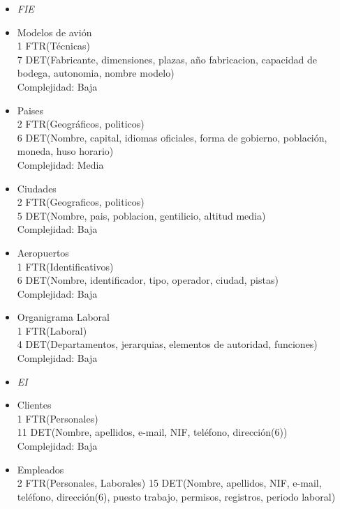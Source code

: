 \begin{enumerate}
	\begin{itemize}
	\item\textit{FIE}
		\item Modelos de avión \\
			1 FTR(Técnicas) \\
			7 DET(Fabricante, dimensiones, plazas, año fabricacion, capacidad de bodega, autonomia, nombre modelo) \\
			Complejidad: Baja\\
		\item Paises \\
			2 FTR(Geográficos, politicos) \\
			6 DET(Nombre, capital, idiomas oficiales, forma de gobierno, población, moneda, huso horario) \\
			Complejidad: Media\\	
		\item Ciudades \\
			2 FTR(Geograficos, politicos) \\
			5 DET(Nombre, pais, poblacion, gentilicio, altitud media) \\
			Complejidad: Baja\\
		\item Aeropuertos \\
			1 FTR(Identificativos) \\
			6 DET(Nombre, identificador, tipo, operador, ciudad, pistas) \\
			Complejidad: Baja\\
		\item Organigrama Laboral \\
			1 FTR(Laboral) \\
			4 DET(Departamentos, jerarquias, elementos de autoridad, funciones) \\
			Complejidad: Baja\\
	\end{itemize}
	\begin{itemize}
	\item \textit{EI}
		\item Clientes \\
			1 FTR(Personales) \\
			11 DET(Nombre, apellidos, e-mail, NIF, teléfono, dirección(6)) \\
			Complejidad: Baja\\
		\item Empleados \\
			2 FTR(Personales, Laborales)
			15 DET(Nombre, apellidos, NIF, e-mail, teléfono, dirección(6), puesto trabajo, permisos, registros, periodo laboral)

\end{itemize}
\end{enumerate}
